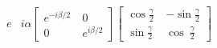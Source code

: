 \documentclass[preview]{standalone}
\begin{document}
\begin{align*}
e&{i\alpha} \begin{bmatrix} e^{-i\beta/2}\
        & 0 \\[2mm] 0 & e^{i\beta/2} \end{bmatrix} \begin{bmatrix} \cos \frac{\gamma}{2}\
        & -\sin \frac{\gamma}{2} \\[2mm] \sin \frac{\gamma}{2} & \cos\
        \frac{\gamma}{2} \end{bmatrix}
\end{align*}
\end{document}

